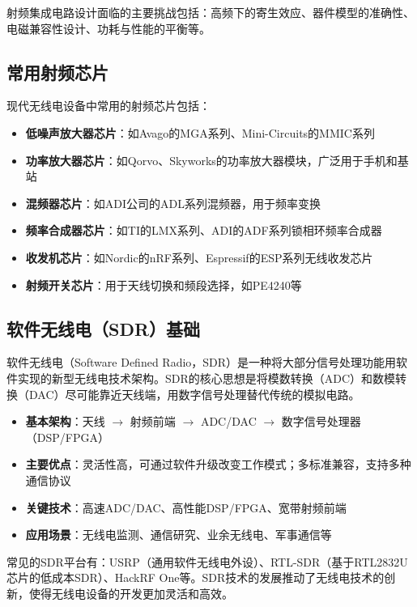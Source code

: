 \documentclass[12pt,UTF8]{ctexbook}
\begin{document}
射频集成电路设计面临的主要挑战包括：高频下的寄生效应、器件模型的准确性、电磁兼容性设计、功耗与性能的平衡等。

\subsection{常用射频芯片}

现代无线电设备中常用的射频芯片包括：

\begin{itemize}[leftmargin=3.5em]
    \item \textbf{低噪声放大器芯片}：如Avago的MGA系列、Mini-Circuits的MMIC系列
    \item \textbf{功率放大器芯片}：如Qorvo、Skyworks的功率放大器模块，广泛用于手机和基站
    \item \textbf{混频器芯片}：如ADI公司的ADL系列混频器，用于频率变换
    \item \textbf{频率合成器芯片}：如TI的LMX系列、ADI的ADF系列锁相环频率合成器
    \item \textbf{收发机芯片}：如Nordic的nRF系列、Espressif的ESP系列无线收发芯片
    \item \textbf{射频开关芯片}：用于天线切换和频段选择，如PE4240等
\end{itemize}

\subsection{软件无线电（SDR）基础}

软件无线电（Software Defined Radio，SDR）是一种将大部分信号处理功能用软件实现的新型无线电技术架构。SDR的核心思想是将模数转换（ADC）和数模转换（DAC）尽可能靠近天线端，用数字信号处理替代传统的模拟电路。

\begin{itemize}[leftmargin=3.5em]
    \item \textbf{基本架构}：天线 $\rightarrow$ 射频前端 $\rightarrow$ ADC/DAC $\rightarrow$ 数字信号处理器（DSP/FPGA）
    \item \textbf{主要优点}：灵活性高，可通过软件升级改变工作模式；多标准兼容，支持多种通信协议
    \item \textbf{关键技术}：高速ADC/DAC、高性能DSP/FPGA、宽带射频前端
    \item \textbf{应用场景}：无线电监测、通信研究、业余无线电、军事通信等
\end{itemize}

常见的SDR平台有：USRP（通用软件无线电外设）、RTL-SDR（基于RTL2832U芯片的低成本SDR）、HackRF One等。SDR技术的发展推动了无线电技术的创新，使得无线电设备的开发更加灵活和高效。
\end{document}
